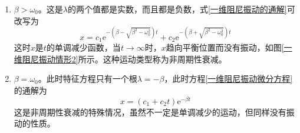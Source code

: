 \begin{enumerate}
	\item $\beta > \omega_0$。这是$\lambda$的两个值都是实数，而且都是负数，式\eqref{一维阻尼振动的通解}可改写为
	\begin{equation}
		x = c_1 \mathrm{e}^{-(\beta-\sqrt{\beta^2-\omega_0^2})t} + c_2 \mathrm{e}^{-(\beta+\sqrt{\beta^2-\omega_0^2})t}
	\end{equation}
	这时$x$是$t$的单调减少函数，当$t \to \infty$时，$x$趋向平衡位置而没有振动，如图\ref{一维阻尼振动情形2}所示。这种运动类型称为{\heiti 非周期性衰减}。
	
	\item $\beta = \omega_0$。此时特征方程只有一个根$\lambda=-\beta$，此时方程\eqref{一维阻尼振动微分方程}的通解为
	\begin{equation}
		x = (c_1+c_2 t) \mathrm{e}^{-\beta t}
	\end{equation}
	这是非周期性衰减的特殊情况，虽然不一定是单调减少的运动，但同样没有振动的性质。
\end{enumerate}

